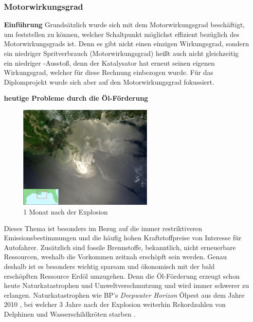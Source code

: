\subsubsection{Motorwirkungsgrad}
\label{subsec:motorwirkungsgrad}

\textbf{Einführung\newline}
Grundsätzlich wurde sich mit dem Motorwirkungsgrad beschäftigt, um feststellen zu können, welcher Schaltpunkt möglichst effizient bezüglich des Motorwirkungsgrads ist. Denn es gibt nicht einen einzigen Wirkungsgrad, sondern ein niedriger Spritverbrauch (Motorwirkungsgrad) heißt auch nicht gleichzeitig ein niedriger -Ausstoß, denn der Katalysator hat erneut seinen eigenen Wirkungsgrad, welcher für diese Rechnung einbezogen wurde. Für das Diplomprojekt wurde sich aber auf den Motorwirkungsgrad fokussiert.

\textbf{heutige Probleme durch die Öl-Förderung\newline}
\begin{figure}\centering
    \includegraphics[width=0.6\textwidth]{images/bpOilSpillSatelite}
    \caption{1 Monat nach der Explosion \cite{SIMR.CH2-motorwirkungsgrad.bpOilSpillSatelite}} \label{Fig:imgBPOilSpill}
\end{figure}
Dieses Thema ist besonders im Bezug auf die immer restriktiveren Emissionsbestimmungen und die häufig hohen Kraftstoffpreise von Interesse für Autofahrer. Zusätzlich sind fossile Brennstoffe, bekanntlich, nicht erneuerbare Ressourcen, weshalb die Vorkommen zeitnah erschöpft sein werden. Genau deshalb ist es besonders wichtig sparsam und ökonomisch mit der bald erschöpften Ressource Erdöl umzugehen. 
Denn die Öl-Förderung erzeugt schon heute Naturkatastrophen und Umweltverschmutzung und wird immer schwerer zu erlangen.
Naturkatastrophen wie BP's \textit{Deepwater Horizon} Ölpest aus dem Jahre 2010 \cite{SIMR.CH2-motorwirkungsgrad.BPSpillGeneral}, bei welcher 3 Jahre nach der Explosion weiterhin Rekordzahlen von Delphinen und Wasserschildkröten starben \cite{SIMR.CH2-motorwirkungsgrad.BPSpillDeaths}. 

